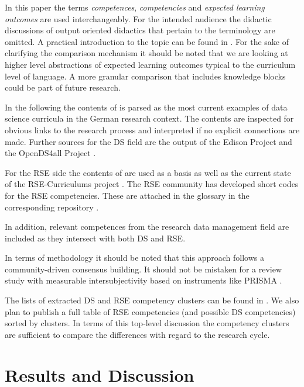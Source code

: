 \documentclass[
        english,biblatex
    ]{lni}
\begin{document}
    In this paper the terms \emph{competences}, \emph{competencies} and
    \emph{expected learning outcomes} are used interchangeably. For the
    intended audience the didactic discussions of output oriented
    didactics that pertain to the terminology are omitted. A practical
    introduction to the topic can be found in \autocite[112]{Dehne2021}.
    For the sake of clarifying the comparison mechanism it should be
    noted that we are looking at higher level abstractions of expected
    learning outcomes typical to the curriculum level of language. A
    more granular comparison that includes knowledge blocks could be
    part of future research.

    In the following the contents of \autocite{GI2021DataScience} is
    parsed as the most current examples of data science curricula in the
    German research context. The contents are inspected for obvious
    links to the research process and interpreted if no explicit
    connections are made. Further sources for the DS field are the
    output of the Edison Project \autocite{EDSF2017} and the OpenDS4all
    Project \autocite{OpenDS4All2020}.

    For the RSE side the contents of \autocite{Goth2024RSE} are used as
    a basis as well as the current state of the RSE-Curriculums project
    \autocite{RSECurriculums2021}. The RSE community has developed short
    codes for the RSE competencies. These are attached in the glossary
    in the corresponding repository \autocite{ds2rse2025}.

    In addition, relevant competences from the research data management
    field \autocite{petersen_2025_15025246} are included as they
    intersect with both DS and RSE.

    In terms of methodology it should be noted that this approach
    follows a community-driven consensus building. It should not be
    mistaken for a review study with measurable intersubjectivity based
    on instruments like PRISMA \autocite{Page2021PRISMA}.

    The lists of extracted DS and RSE competency clusters can be found
    in \autocite{ds2rse2025}. We also plan to publish a full table of
    RSE competencies (and possible DS competencies) sorted by clusters.
    In terms of this top-level discussion the competency clusters are
    sufficient to compare the differences with regard to the research
    cycle.

    \section{Results and Discussion}\label{results-and-discussion}
\end{document}
